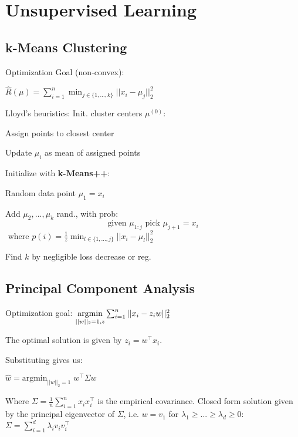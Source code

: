 \section*{Unsupervised Learning}

\subsection*{k-Means Clustering}

Optimization Goal (non-convex):

\qquad $\hat{R} (\mu) = \sum_{i=1}^n \min_{j\in \{1,...,k\}} ||x_i - \mu_j||_2^2$

Lloyd's heuristics:
Init. cluster centers $\mu^{(0)}$:
\begin{compactitem}
	\item Assign points to closest center				
	\item Update $\mu_i$ as mean of assigned points
\end{compactitem}

Initialize with \textbf{k-Means++}:

\begin{compactitem}
	\item Random data point $\mu_1 = x_i$
	\item Add $\mu_2,...,\mu_k$ rand., with prob:
		$$\text{given } \mu_{1:j} \text{ pick } \mu_{j+1} = x_i$$ 
		$\text{ where } p(i) = \frac{1}{z} \min_{l \in \{1,...,j\}} ||x_i - \mu_l||_2^2$
\end{compactitem}

Find $k$ by negligible loss decrease or reg.

\subsection*{Principal Component Analysis}

Optimization goal:
$\underset{||w||_2 = 1, z}{\text{argmin}} \sum_{i=1}^n ||x_i - z_i w||_2^2$

The optimal solution is given by $z_i = w^\top x_i$.  

Substituting gives us:

\qquad \qquad $\hat{w} = \text{argmin}_{||w||_2=1} \; w^\top \Sigma w$

Where $\Sigma = \frac{1}{n} \sum_{i=1}^n x_i x_i^\top$ is the empirical covariance. Closed form solution given by the principal eigenvector of $\Sigma$, i.e. $w = v_1$ for $\lambda_1 \geq ... \geq \lambda_d \geq 0$:
$\Sigma = \sum_{i=1}^d \lambda_i v_i v_i^\top$

